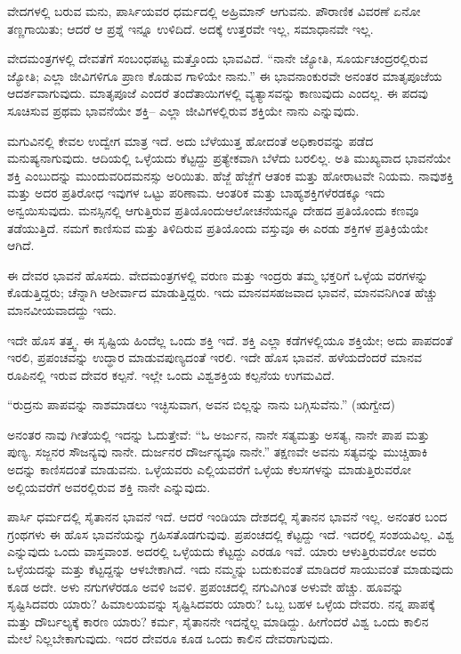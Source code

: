 ವೇದಗಳಲ್ಲಿ ಬರುವ ಮನು, ಪಾರ್ಸಿಯವರ ಧರ್ಮದಲ್ಲಿ ಅಹ್ರಿಮಾನ್​ ಆಗುವನು. ಪೌರಾಣಿಕ ವಿವರಣೆ ಏನೋ ತಣ್ಣಗಾಯಿತು; ಆದರೆ ಆ ಪ್ರಶ್ನೆ ಇನ್ನೂ ಉಳಿದಿದೆ. ಅದಕ್ಕೆ ಉತ್ತರವೇ ಇಲ್ಲ, ಸಮಾಧಾನವೇ ಇಲ್ಲ.

ವೇದಮಂತ್ರಗಳಲ್ಲಿ ದೇವತೆಗೆ ಸಂಬಂಧಪಟ್ಟ ಮತ್ತೊಂದು ಭಾವವಿದೆ. “ನಾನೇ ಜ್ಯೋತಿ, ಸೂರ್ಯಚಂದ್ರರಲ್ಲಿರುವ ಜ್ಯೋತಿ; ಎಲ್ಲಾ ಜೀವಿಗಳಿಗೂ ಪ್ರಾಣ ಕೊಡುವ ಗಾಳಿಯೇ ನಾನು.” ಈ ಭಾವನಾಂಕುರವೇ ಅನಂತರ ಮಾತೃಪೂಜೆಯ ಆದರ್ಶವಾಗುವುದು. ಮಾತೃಪೂಜೆ ಎಂದರೆ ತಂದೆತಾಯಿಗಳಲ್ಲಿ ವ್ಯತ್ಯಾಸವನ್ನು ಕಾಣುವುದು ಎಂದಲ್ಲ. ಈ ಪದವು ಸೂಚಿಸುವ ಪ್ರಥಮ ಭಾವನೆಯೇ ಶಕ್ತಿ– ಎಲ್ಲಾ ಜೀವಿಗಳಲ್ಲಿರುವ ಶಕ್ತಿಯೇ ನಾನು ಎನ್ನುವುದು.

ಮಗುವಿನಲ್ಲಿ ಕೇವಲ ಉದ್ವೇಗ ಮಾತ್ರ ಇದೆ. ಅದು ಬೆಳೆಯುತ್ತ ಹೋದಂತೆ ಅಧಿಕಾರ\-ವನ್ನು ಪಡೆದ ಮನುಷ್ಯನಾಗುವುದು. ಆದಿಯಲ್ಲಿ ಒಳ್ಳೆಯದು ಕೆಟ್ಟದ್ದು ಪ್ರತ್ಯೇಕವಾಗಿ ಬೆಳೆದು ಬರಲಿಲ್ಲ. ಅತಿ ಮುಖ್ಯವಾದ ಭಾವನೆಯೇ ಶಕ್ತಿ ಎಂಬುದನ್ನು ಮುಂದುವರಿದ\break ಮನಸ್ಸು ಅರಿಯಿತು. ಹೆಜ್ಜೆ ಹೆಜ್ಜೆಗೆ ಆತಂಕ ಮತ್ತು ಹೋರಾಟವೇ ನಿಯಮ. ನಾವು\break ಶಕ್ತಿ ಮತ್ತು ಅದರ ಪ್ರತಿರೋಧ ಇವುಗಳ ಒಟ್ಟು ಪರಿಣಾಮ. ಆಂತರಿಕ ಮತ್ತು ಬಾಹ್ಯ\break ಶಕ್ತಿಗಳೆರಡಕ್ಕೂ ಇದು ಅನ್ವಯಿಸುವುದು. ಮನಸ್ಸಿನಲ್ಲಿ ಆಗುತ್ತಿರುವ ಪ್ರತಿಯೊಂದು\break ಆಲೋಚನೆಯನ್ನೂ ದೇಹದ ಪ್ರತಿಯೊಂದು ಕಣವೂ ತಡೆಯುತ್ತಿದೆ. ನಮಗೆ ಕಾಣಿಸುವ ಮತ್ತು ತಿಳಿದಿರುವ ಪ್ರತಿಯೊಂದು ವಸ್ತುವೂ ಈ ಎರಡು ಶಕ್ತಿಗಳ ಪ್ರತಿಕ್ರಿಯೆಯೇ ಆಗಿದೆ.

ಈ ದೇವರ ಭಾವನೆ ಹೊಸದು. ವೇದಮಂತ್ರಗಳಲ್ಲಿ ವರುಣ ಮತ್ತು ಇಂದ್ರರು ತಮ್ಮ ಭಕ್ತರಿಗೆ ಒಳ್ಳೆಯ ವರಗಳನ್ನು ಕೊಡುತ್ತಿದ್ದರು; ಚೆನ್ನಾಗಿ ಆಶೀರ್ವಾದ ಮಾಡುತ್ತಿದ್ದರು. ಇದು ಮಾನವಸಹಜವಾದ ಭಾವನೆ, ಮಾನವನಿಗಿಂತ ಹೆಚ್ಚು ಮಾನವೀಯವಾದದ್ದು ಇದು.

ಇದೇ ಹೊಸ ತತ್ತ್ವ. ಈ ಸೃಷ್ಟಿಯ ಹಿಂದೆಲ್ಲ ಒಂದು ಶಕ್ತಿ ಇದೆ. ಶಕ್ತಿ ಎಲ್ಲಾ ಕಡೆಗಳ\-ಲ್ಲಿಯೂ ಶಕ್ತಿಯೇ; ಅದು ಪಾಪದಂತೆ ಇರಲಿ, ಪ್ರಪಂಚವನ್ನು ಉದ್ಧಾರ ಮಾಡುವ\break ಪುಣ್ಯದಂತೆ ಇರಲಿ. ಇದೇ ಹೊಸ ಭಾವನೆ. ಹಳೆಯದೆಂದರೆ ಮಾನವ ರೂಪಿನಲ್ಲಿ ಇರುವ ದೇವರ ಕಲ್ಪನೆ. ಇಲ್ಲೇ ಒಂದು ವಿಶ್ವಶಕ್ತಿಯ ಕಲ್ಪನೆಯ ಉಗಮವಿದೆ.

“ರುದ್ರನು ಪಾಪವನ್ನು ನಾಶಮಾಡಲು ಇಚ್ಛಿಸುವಾಗ, ಅವನ ಬಿಲ್ಲನ್ನು ನಾನು ಬಗ್ಗಿಸುವೆನು.” (ಋಗ್ವೇದ)

ಅನಂತರ ನಾವು ಗೀತೆಯಲ್ಲಿ ಇದನ್ನು ಓದುತ್ತೇವೆ: “ಓ ಅರ್ಜುನ, ನಾನೇ ಸತ್ಯ\break ಮತ್ತು ಅಸತ್ಯ, ನಾನೇ ಪಾಪ ಮತ್ತು ಪುಣ್ಯ. ಸಜ್ಜನರ ಸೌಜನ್ಯವು ನಾನೇ. ದುರ್ಜನರ ದೌರ್ಜನ್ಯವೂ ನಾನೇ.” ತಕ್ಷಣವೇ ಅವನು ಸತ್ಯವನ್ನು ಮುಚ್ಚಿಹಾಕಿ ಅದನ್ನು ಕಾಣಿಸದಂತೆ ಮಾಡುವನು. ಒಳ್ಳೆಯವರು ಎಲ್ಲಿಯವರೆಗೆ ಒಳ್ಳೆಯ ಕೆಲಸಗಳನ್ನು ಮಾಡುತ್ತಿರುವರೋ ಅಲ್ಲಿಯವರೆಗೆ ಅವರಲ್ಲಿರುವ ಶಕ್ತಿ ನಾನೇ ಎನ್ನುವುದು.

\eject

ಪಾರ್ಸಿ ಧರ್ಮದಲ್ಲಿ ಸೈತಾನನ ಭಾವನೆ ಇದೆ. ಆದರೆ ಇಂಡಿಯಾ ದೇಶದಲ್ಲಿ ಸೈತಾನನ ಭಾವನೆ ಇಲ್ಲ. ಅನಂತರ ಬಂದ ಗ್ರಂಥಗಳು ಈ ಹೊಸ ಭಾವನೆಯನ್ನು ಗ್ರಹಿಸತೊಡಗುವುವು. ಪ್ರಪಂಚದಲ್ಲಿ ಕೆಟ್ಟದ್ದು ಇದೆ. ಇದರಲ್ಲಿ ಸಂಶಯವಿಲ್ಲ. ವಿಶ್ವ ಎನ್ನುವುದು ಒಂದು ವಾಸ್ತವಾಂಶ. ಅದರಲ್ಲಿ ಒಳ್ಳೆಯದು ಕೆಟ್ಟದ್ದು ಎರಡೂ ಇವೆ. ಯಾರು ಆಳುತ್ತಿರುವರೋ ಅವರು ಒಳ್ಳೆಯದನ್ನು ಮತ್ತು ಕೆಟ್ಟದ್ದನ್ನು ಆಳಬೇಕಾಗಿದೆ. ಇದು ನಮ್ಮನ್ನು ಬದುಕುವಂತೆ ಮಾಡಿದರೆ ಸಾಯುವಂತೆ ಮಾಡುವುದು ಕೂಡ ಅದೇ. ಅಳು ನಗುಗಳೆರಡೂ ಅವಳಿ ಜವಳಿ. ಪ್ರಪಂಚದಲ್ಲಿ ನಗುವಿಗಿಂತ ಅಳುವೇ ಹೆಚ್ಚು. ಹೂವನ್ನು ಸೃಷ್ಟಿಸಿದವರು ಯಾರು? ಹಿಮಾಲಯವನ್ನು ಸೃಷ್ಟಿಸಿದವರು ಯಾರು? ಒಬ್ಬ ಬಹಳ ಒಳ್ಳೆಯ ದೇವರು. ನನ್ನ ಪಾಪಕ್ಕೆ ಮತ್ತು ದೌರ್ಬಲ್ಯಕ್ಕೆ ಕಾರಣ ಯಾರು? ಕರ್ಮ, ಸೈತಾನನೇ ಇದನ್ನೆಲ್ಲ ಮಾಡಿದ್ದು. ಹೀಗೆಂದರೆ ವಿಶ್ವ ಒಂದು ಕಾಲಿನ ಮೇಲೆ ನಿಲ್ಲಬೇಕಾಗುವುದು. ಇದರ ದೇವರೂ ಕೂಡ ಒಂದು ಕಾಲಿನ ದೇವರಾಗುವುದು.

